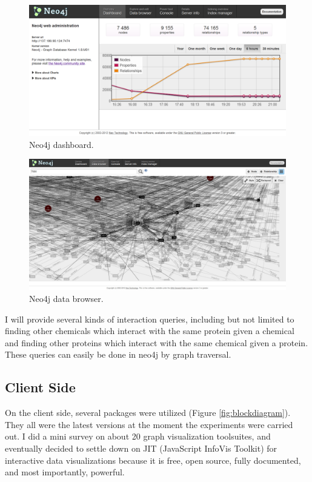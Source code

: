 \documentclass[10pt,conference,compsocconf]{../IEEEtran}
\begin{document}
\begin{figure}
\centering
\includegraphics[width=\linewidth]{Dashboard.png}
\caption{Neo4j dashboard.}
\label{fig:Dashboard}
\end{figure}

\begin{figure}
\centering
\includegraphics[width=\linewidth]{DataBrowser.png}
\caption{Neo4j data browser.}
\label{fig:DataBrowser}
\end{figure}

I will provide several kinds of interaction queries, including but not limited to finding other chemicals which interact with the same protein given a chemical and finding other proteins which interact with the same chemical given a protein. These queries can easily be done in neo4j by graph traversal.

\subsection{Client Side}

On the client side, several packages were utilized (Figure \ref{fig:blockdiagram}). They all were the latest versions at the moment the experiments were carried out. I did a mini survey on about 20 graph visualization toolsuites, and eventually decided to settle down on JIT (JavaScript InfoVis Toolkit) for interactive data visualizations because it is free, open source, fully documented, and most importantly, powerful.
\end{document}
